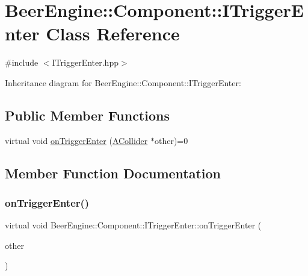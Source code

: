 \hypertarget{class_beer_engine_1_1_component_1_1_i_trigger_enter}{}\section{Beer\+Engine\+:\+:Component\+:\+:I\+Trigger\+Enter Class Reference}
\label{class_beer_engine_1_1_component_1_1_i_trigger_enter}


{\ttfamily \#include $<$I\+Trigger\+Enter.\+hpp$>$}



Inheritance diagram for Beer\+Engine\+:\+:Component\+:\+:I\+Trigger\+Enter\+:
\subsection*{Public Member Functions}
\begin{DoxyCompactItemize}
\item 
virtual void \mbox{\hyperlink{class_beer_engine_1_1_component_1_1_i_trigger_enter_aab0d007cc2a256bc5aa542cd7dfdeef0}{on\+Trigger\+Enter}} (\mbox{\hyperlink{class_beer_engine_1_1_component_1_1_a_collider}{A\+Collider}} $\ast$other)=0
\end{DoxyCompactItemize}


\subsection{Member Function Documentation}
\mbox{\label{class_beer_engine_1_1_component_1_1_i_trigger_enter_aab0d007cc2a256bc5aa542cd7dfdeef0}} 
\subsubsection{\texorpdfstring{on\+Trigger\+Enter()}{onTriggerEnter()}}
{\footnotesize\ttfamily virtual void Beer\+Engine\+::\+Component\+::\+I\+Trigger\+Enter\+::on\+Trigger\+Enter (\begin{DoxyParamCaption}\item[{\mbox{\hyperlink{class_beer_engine_1_1_component_1_1_a_collider}{A\+Collider}} $\ast$}]{other }\end{DoxyParamCaption})\hspace{0.3cm}{\ttfamily [pure virtual]}}



